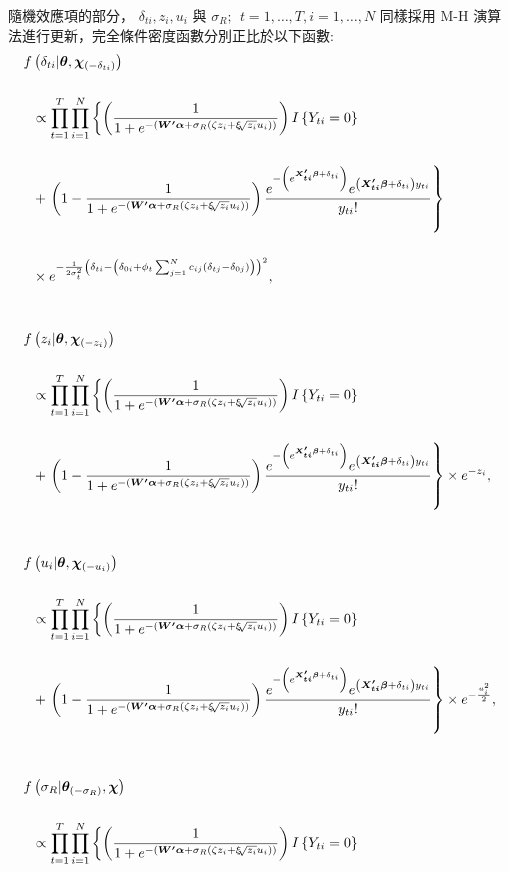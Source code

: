 \documentclass[12pt,a4paper]{article}
\begin{document}
\begin{CJK}{UTF8}{bkai}
\noindent
\newpage
隨機效應項的部分， $\delta_{ti},z_i,u_i$ 與 $\sigma_R;\:\:t=1,\dots,T, i=1,\dots,N$ 同樣採用 M-H 演算法進行更新，完全條件密度函數分別正比於以下函數:
 \begin{align*}
 \setlength\abovedisplayskip{25pt}
 \setlength\belowdisplayskip{25pt}
 f & \left(\delta_{ti}|\bm{\theta},\bm{\chi}_{(-\delta_{ti})}\right) \\[5mm]
 & \propto \prod_{t=1}^T\prod_{i=1}^N\left\{\left(\frac{1}{1+e^{-(\bm{W^\prime}\bm{\alpha}+\sigma_R(\zeta z_i+\xi \sqrt[]{z_i} u_i))}}\right)I\left\{Y_{ti} = 0\right\} \right. \\[5mm]
 & + \left.\left(1-\frac{1}{1+e^{-(\bm{W^\prime}\bm{\alpha}+\sigma_R(\zeta z_i+\xi \sqrt[]{z_i} u_i))}}\right)\frac{e^{-\left(e^{\bm{X_{ti}^\prime}\bm{\beta}+\delta_{ti}}\right)}e^{\left(\bm{X_{ti}^\prime}\bm{\beta}+\delta_{ti}\right)y_{ti}}}{y_{ti}!} \right\} \\[5mm]
 & \times e^{-\frac{1}{2\sigma_t^2}\left(\delta_{ti}-\left(\delta_{0i}+\phi_t\sum_{j=1}^N c_{ij}\left(\delta_{tj}-\delta_{0j}\right)\right)\right)^2 },\\[10mm]
 f & \left(z_i|\bm{\theta},\bm{\chi}_{(-z_i)}\right) \\[5mm]
 & \propto \prod_{t=1}^T\prod_{i=1}^N\left\{\left(\frac{1}{1+e^{-(\bm{W^\prime}\bm{\alpha}+\sigma_R(\zeta z_i+\xi \sqrt[]{z_i} u_i))}}\right)I\left\{Y_{ti} = 0\right\} \right. \\[5mm]
 & + \left.\left(1-\frac{1}{1+e^{-(\bm{W^\prime}\bm{\alpha}+\sigma_R(\zeta z_i+\xi \sqrt[]{z_i} u_i))}}\right)\frac{e^{-\left(e^{\bm{X_{ti}^\prime}\bm{\beta}+\delta_{ti}}\right)}e^{\left(\bm{X_{ti}^\prime}\bm{\beta}+\delta_{ti}\right)y_{ti}}}{y_{ti}!} \right\} \times e^{-z_i},\\[10mm]
 f & \left(u_i|\bm{\theta},\bm{\chi}_{(-u_i)}\right) \\[5mm]
 & \propto \prod_{t=1}^T\prod_{i=1}^N\left\{\left(\frac{1}{1+e^{-(\bm{W^\prime}\bm{\alpha}+\sigma_R(\zeta z_i+\xi \sqrt[]{z_i} u_i))}}\right)I\left\{Y_{ti} = 0\right\} \right. \\[5mm]
 & + \left.\left(1-\frac{1}{1+e^{-(\bm{W^\prime}\bm{\alpha}+\sigma_R(\zeta z_i+\xi \sqrt[]{z_i} u_i))}}\right)\frac{e^{-\left(e^{\bm{X_{ti}^\prime}\bm{\beta}+\delta_{ti}}\right)}e^{\left(\bm{X_{ti}^\prime}\bm{\beta}+\delta_{ti}\right)y_{ti}}}{y_{ti}!} \right\}  \times e^{-\frac{u_i^2}{2}},\\[10mm]
 f & \left(\sigma_R|\bm{\theta}_{(-\sigma_R)},\bm{\chi}\right) \\[5mm]
 & \propto \prod_{t=1}^T\prod_{i=1}^N\left\{\left(\frac{1}{1+e^{-(\bm{W^\prime}\bm{\alpha}+\sigma_R(\zeta z_i+\xi \sqrt[]{z_i} u_i))}}\right)I\left\{Y_{ti} = 0\right\} \right. \\[5mm]

\end{align*}
\end{CJK}
\end{document}
